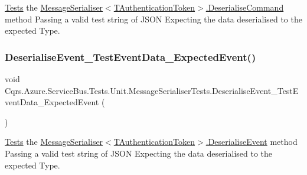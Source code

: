 \hyperlink{namespaceCqrs_1_1Azure_1_1ServiceBus_1_1Tests}{Tests} the \hyperlink{classCqrs_1_1Azure_1_1ServiceBus_1_1MessageSerialiser_af08efd7ea85a4fefd54df34dd9481f95_af08efd7ea85a4fefd54df34dd9481f95}{Message\+Serialiser$<$\+T\+Authentication\+Token$>$.\+Deserialise\+Command} method Passing a valid test string of J\+S\+ON Expecting the data deserialised to the expected Type. 

\mbox{\label{classCqrs_1_1Azure_1_1ServiceBus_1_1Tests_1_1Unit_1_1MessageSerialiserTests_ad7bc69e1f1d8741b8520f76cc5e034c2_ad7bc69e1f1d8741b8520f76cc5e034c2}} 
\subsubsection{\texorpdfstring{Deserialise\+Event\+\_\+\+Test\+Event\+Data\+\_\+\+Expected\+Event()}{DeserialiseEvent\_TestEventData\_ExpectedEvent()}}
{\footnotesize\ttfamily void Cqrs.\+Azure.\+Service\+Bus.\+Tests.\+Unit.\+Message\+Serialiser\+Tests.\+Deserialise\+Event\+\_\+\+Test\+Event\+Data\+\_\+\+Expected\+Event (\begin{DoxyParamCaption}{ }\end{DoxyParamCaption})}



\hyperlink{namespaceCqrs_1_1Azure_1_1ServiceBus_1_1Tests}{Tests} the \hyperlink{classCqrs_1_1Azure_1_1ServiceBus_1_1MessageSerialiser_a9207c867f358e352eee5d3727fe620e4_a9207c867f358e352eee5d3727fe620e4}{Message\+Serialiser$<$\+T\+Authentication\+Token$>$.\+Deserialise\+Event} method Passing a valid test string of J\+S\+ON Expecting the data deserialised to the expected Type. 

